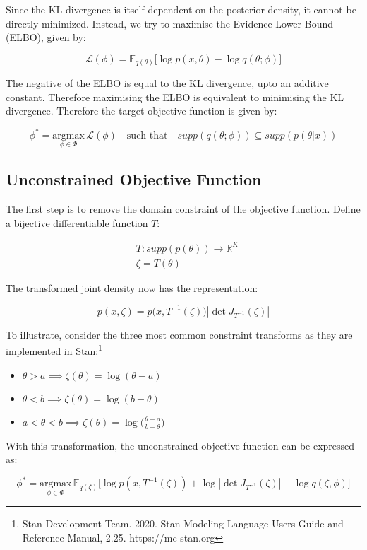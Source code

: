 \documentclass[10pt]{article}
\begin{document}
Since the KL divergence is itself dependent on the posterior density, it cannot be directly minimized. Instead, we try 
to maximise the Evidence Lower Bound (ELBO), given by:

\begin{equation*}
  \mathcal{L}(\phi) = \mathbb{E}_{q(\theta)}\big[\log p(x, \theta) - \log q(\theta;\phi) \big]
\end{equation*}

The negative of the ELBO is equal to the KL divergence, upto an additive constant. Therefore maximising the ELBO is 
equivalent to minimising the KL divergence. Therefore the target objective function is given by:

\begin{equation*}
  \phi^* = \underset{\phi \in \Phi}{\text{argmax}}\, \mathcal{L}(\phi) \quad \text{such that} \quad supp(q(\theta ; \phi)) \subseteq supp(p(\theta | x))
\end{equation*}

\subsection*{Unconstrained Objective Function}

The first step is to remove the domain constraint of the objective function. Define a bijective differentiable function $T$:

\begin{align*}
  &T : supp(p(\theta)) \to \mathbb{R}^K \\
  &\zeta = T(\theta)
\end{align*}

The transformed joint density now has the representation:

\begin{equation*}
  p(x, \zeta) = p\big(x, T^{-1}(\zeta)\big)|\det J_{T^{-1}}(\zeta)| 
\end{equation*}

To illustrate, consider the three most common constraint transforms as they are implemented in Stan:\footnote{Stan Development Team. 2020. Stan Modeling Language Users Guide and Reference Manual, 2.25. https://mc-stan.org}

\begin{itemize}
  \item $\theta > a \implies \zeta(\theta) = \log(\theta - a)$
  \item $\theta < b \implies \zeta(\theta) = \log(b - \theta)$
  \item $a < \theta < b \implies \zeta(\theta) = \log\big(\frac{\theta - a}{b - \theta}\big)$
\end{itemize}

With this transformation, the unconstrained objective function can be expressed as:

\begin{equation*}
  \phi^* = \underset{\phi \in \Phi}{\text{argmax}} \, \mathbb{E}_{q(\zeta)}\big[\log p(x, T^{-1}(\zeta)) + \log |\det J_{T^{-1}}(\zeta)| - \log q(\zeta, \phi) \big]
\end{equation*}
\end{document}
